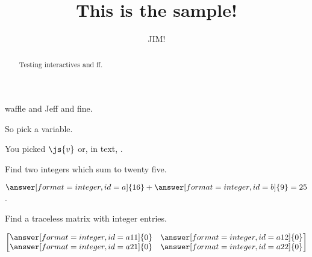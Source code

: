 \documentclass{ximera}
\title{This is the sample!}
\author{JIM!}
\begin{document}
\begin{abstract}
Testing interactives and ff.
\end{abstract}
\maketitle

waffle and Jeff and fine.


\begin{problem}
  So pick a variable.
  \begin{multipleChoice}[id=v]
  \end{multipleChoice}

  You picked $\js{v}$ or, in text, .



  


\end{problem}

\begin{problem}
  Find two integers which sum to twenty five.

  \begin{validator}[a+b==25]
    $\answer[format=integer,id=a]{16} + \answer[format=integer,id=b]{9} = 25$.
  \end{validator}

  Find a traceless matrix with integer entries.
  \begin{validator}[a11+a22==0]
    \[
      \begin{bmatrix}
        \answer[format=integer,id=a11]{0} &         \answer[format=integer,id=a12]{0} \\
        \answer[format=integer,id=a21]{0} &         \answer[format=integer,id=a22]{0} \\
      \end{bmatrix}
      \]
  \end{validator}


\end{problem}
\end{document}
